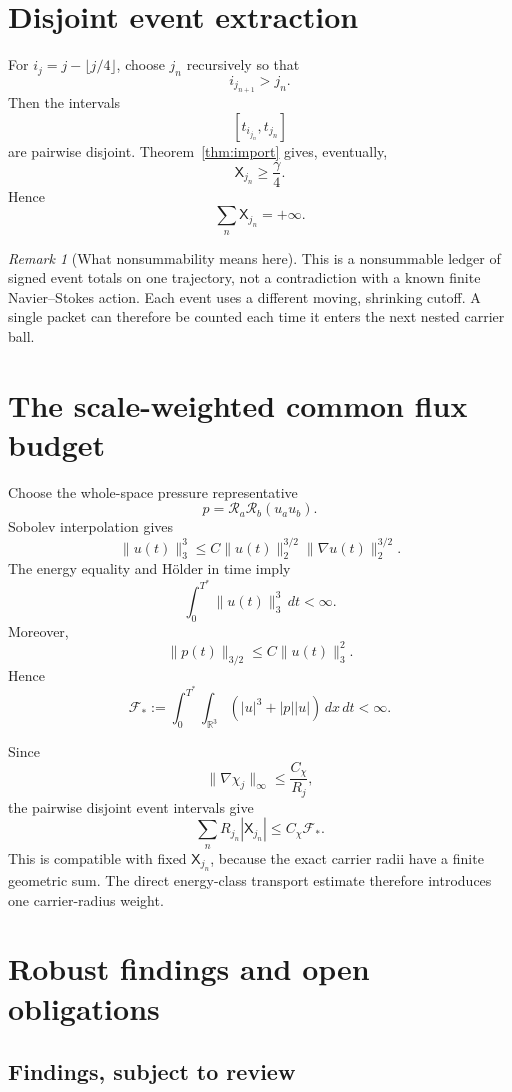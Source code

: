 \documentclass[11pt]{article}
\theoremstyle{remark}
\newtheorem{remark}[theorem]{Remark}
\newcommand{\R}{\mathbb R}
\begin{document}
\section{Disjoint event extraction}

For \(i_j=j-\lfloor j/4\rfloor\), choose \(j_n\) recursively so that
\[
 i_{j_{n+1}}>j_n.
\]
Then the intervals
\[
 [t_{i_{j_n}},t_{j_n}]
\]
are pairwise disjoint.  Theorem~\ref{thm:import} gives, eventually,
\[
 \boxed{
 \mathsf X_{j_n}\ge\frac{\gamma}{4}.
 }
\]
Hence
\[
 \sum_n\mathsf X_{j_n}=+\infty.
\]

\begin{remark}[What nonsummability means here]
This is a nonsummable ledger of signed event totals on one trajectory, not
a contradiction with a known finite Navier--Stokes action.  Each event uses
a different moving, shrinking cutoff.  A single packet can therefore be
counted each time it enters the next nested carrier ball.
\end{remark}

\section{The scale-weighted common flux budget}

Choose the whole-space pressure representative
\[
 p=\mathcal R_a\mathcal R_b(u_au_b).
\]
Sobolev interpolation gives
\[
 \|u(t)\|_3^3
 \le
 C\|u(t)\|_2^{3/2}\|\nabla u(t)\|_2^{3/2}.
\]
The energy equality and H{\"o}lder in time imply
\[
 \int_0^{T^*}\|u(t)\|_3^3\,dt<\infty.
\]
Moreover,
\[
 \|p(t)\|_{3/2}\le C\|u(t)\|_3^2.
\]
Hence
\[
 \boxed{
 \mathcal F_*:=
 \int_0^{T^*}\!\!\int_{\R^3}
 \left(|u|^3+|p||u|\right)\,dx\,dt
 <\infty.
 }
\]

Since
\[
 \|\nabla\chi_j\|_\infty\le\frac{C_\chi}{R_j},
\]
the pairwise disjoint event intervals give
\[
 \boxed{
 \sum_nR_{j_n}|\mathsf X_{j_n}|
 \le
 C_\chi\mathcal F_*.
 }
\]
This is compatible with fixed \(\mathsf X_{j_n}\), because the exact carrier
radii have a finite geometric sum.  The direct energy-class transport
estimate therefore introduces one carrier-radius weight.

\section{Robust findings and open obligations}

\subsection*{Findings, subject to review}
\end{document}
